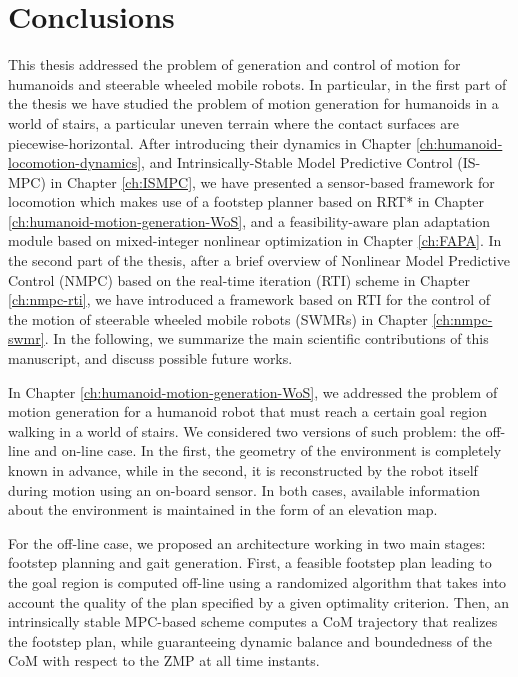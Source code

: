 \chapter{Conclusions}
\label{ch:conclusions}
This thesis addressed the problem of generation and control of motion for 
humanoids and steerable wheeled 
mobile robots. In particular, in the first part of the thesis
we have studied the problem of motion generation for humanoids 
in a world of stairs, a particular uneven terrain where the contact 
surfaces are piecewise-horizontal. After introducing their dynamics in Chapter
\ref{ch:humanoid-locomotion-dynamics}, and Intrinsically-Stable Model Predictive
Control (IS-MPC) in Chapter \ref{ch:ISMPC},
we have presented a sensor-based framework for locomotion which makes use of a
footstep planner 
based on RRT* in Chapter \ref{ch:humanoid-motion-generation-WoS}, and a 
feasibility-aware plan adaptation module based on mixed-integer nonlinear
optimization in Chapter \ref{ch:FAPA}. In the second part of the thesis,
after a brief overview of Nonlinear Model Predictive Control (NMPC) based on the
real-time iteration (RTI) scheme in Chapter \ref{ch:nmpc-rti}, we have 
introduced a framework based on RTI for the control of the motion of steerable wheeled 
mobile robots (SWMRs) in Chapter \ref{ch:nmpc-swmr}. In the following, we
summarize the main scientific contributions of this manuscript, and discuss 
possible future works.

\medskip

In Chapter \ref{ch:humanoid-motion-generation-WoS},
we addressed the problem of motion generation for a humanoid
robot that must reach a certain goal region walking in a  world of stairs.
We considered two versions of such problem: the off-line and on-line case. 
In the first, the geometry of the environment is completely known in advance,
while in the second, it is reconstructed by the robot itself during motion using
an on-board sensor. In both cases, available information about the environment
is maintained in the form of an elevation map. 

For the off-line case, we proposed an architecture working in two main stages:
footstep planning and gait generation.
First, a feasible footstep plan leading to the goal region is computed off-line
using a randomized algorithm that takes into account the quality of the plan specified
by a given optimality criterion.
Then, an intrinsically stable MPC-based scheme computes a CoM trajectory that
realizes the footstep plan, while guaranteeing dynamic balance and
boundedness of the CoM with respect to the ZMP at all time instants.

